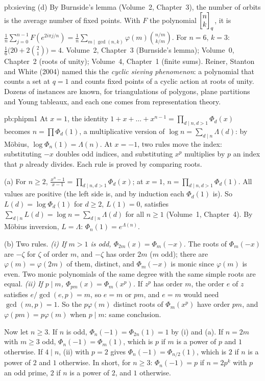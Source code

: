 \begin{solution}{pb:sieving}
(d) By Burnside's lemma (Volume~2, Chapter~3), the number of orbits is the average number of fixed points. With $F$ the polynomial $\begin{bmatrix}n\\k\end{bmatrix}_q$, it is
$\frac1n\sum_{j=0}^{n-1}F(e^{2i\pi j/n})=\frac1n\sum_{m\mid\gcd(n,k)}\varphi(m)\binom{n/m}{k/m}$. For $n=6$, $k=3$:
$\frac16\bigl(20+2\binom21\bigr)=4$.
\tools Volume~2, Chapter~3 (Burnside's lemma); Volume~0, Chapter~2 (roots of unity); Volume~4, Chapter~1 (finite sums).
\leads Reiner, Stanton and White (2004) named this the \emph{cyclic sieving phenomenon}: a polynomial that counts a set at
$q=1$ and counts fixed points of a cyclic action at roots of unity. Dozens of instances are known, for triangulations of
polygons, plane partitions and Young tableaux, and each one comes from representation theory.
\end{solution}

\begin{solution}{pb:phipm1}
\idea At $x=1$, the identity $1+x+\dots+x^{n-1}=\prod_{d\mid n,d>1}\Phi_d(x)$ becomes $n=\prod\Phi_d(1)$, a
multiplicative version of $\log n=\sum_{d\mid n}\Lambda(d)$: by Möbius, $\log\Phi_n(1)=\Lambda(n)$. At $x=-1$, two rules
move the index: substituting $-x$ doubles odd indices, and substituting $x^p$ multiplies by $p$ an index that $p$
already divides. Each rule is proved by comparing roots.

\writeup (a) For $n\ge2$, $\frac{x^n-1}{x-1}=\prod_{d\mid n,d>1}\Phi_d(x)$; at $x=1$, $n=\prod_{d\mid n,d>1}\Phi_d(1)$. All values
are positive (the left side is, and by induction each $\Phi_d(1)$ is). So $L(d)=\log\Phi_d(1)$ for $d\ge2$, $L(1)=0$,
satisfies $\sum_{d\mid n}L(d)=\log n=\sum_{d\mid n}\Lambda(d)$ for all $n\ge1$ (Volume~1, Chapter~4). By Möbius inversion, $L=\Lambda$:
$\Phi_n(1)=e^{\Lambda(n)}$.

(b) Two rules. \emph{(i) If $m>1$ is odd, $\Phi_{2m}(x)=\Phi_m(-x)$.} The roots of $\Phi_m(-x)$ are $-\zeta$ for $\zeta$ of order
$m$, and $-\zeta$ has order $2m$ ($m$ odd); there are $\varphi(m)=\varphi(2m)$ of them, distinct, and $\Phi_m(-x)$ is monic
since $\varphi(m)$ is even. Two monic polynomials of the same degree with the same simple roots are equal.
\emph{(ii) If $p\mid m$, $\Phi_{pm}(x)=\Phi_m(x^p)$.} If $z^p$ has order $m$, the order $e$ of $z$ satisfies
$e/\gcd(e,p)=m$, so $e=m$ or $pm$, and $e=m$ would need $\gcd(m,p)=1$. So the $p\varphi(m)$ distinct roots of $\Phi_m(x^p)$ have
order $pm$, and $\varphi(pm)=p\varphi(m)$ when $p\mid m$: same conclusion.

Now let $n\ge3$. If $n$ is odd, $\Phi_n(-1)=\Phi_{2n}(1)=1$ by (i) and (a). If $n=2m$ with $m\ge3$ odd,
$\Phi_n(-1)=\Phi_m(1)$, which is $p$ if $m$ is a power of $p$ and $1$ otherwise. If $4\mid n$, (ii) with $p=2$ gives
$\Phi_n(-1)=\Phi_{n/2}(1)$, which is $2$ if $n$ is a power of $2$ and $1$ otherwise. In short, for $n\ge3$:
$\Phi_n(-1)=p$ if $n=2p^k$ with $p$ an odd prime, $2$ if $n$ is a power of $2$, and $1$ otherwise.


\end{solution}
